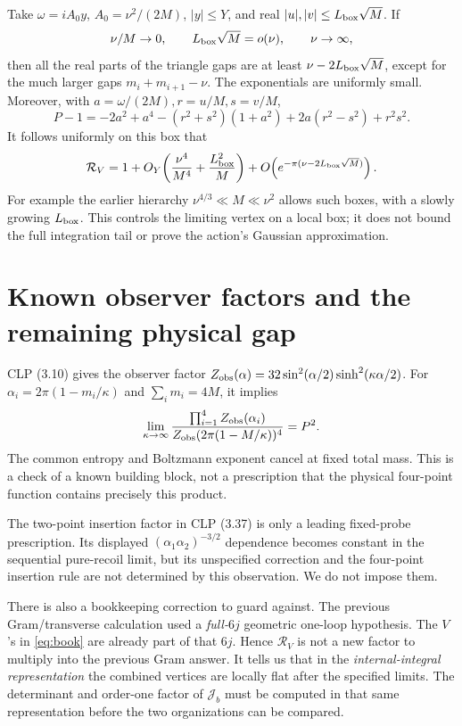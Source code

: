 \documentclass[11pt,a4paper]{article}
\begin{document}
Take \(\omega=iA_0y\), \(A_0=\nu^2/(2M)\), \(|y|\le Y\), and
real \(|u|,|v|\le L_{\rm box}\sqrt M\). If
\[
 \nu/M\to0,\qquad L_{\rm box}\sqrt M=o(\nu),\qquad \nu\to\infty,
\]
then all the real parts of the triangle gaps are at least
\(\nu-2L_{\rm box}\sqrt M\), except for the much larger gaps
\(m_i+m_{i+1}-\nu\). The exponentials are uniformly small.
Moreover, with \(a=\omega/(2M),r=u/M,s=v/M\),
\[
 P-1=-2a^2+a^4-(r^2+s^2)(1+a^2)+2a(r^2-s^2)+r^2s^2 .
\]
It follows uniformly on this box that
\begin{equation}
 \mathcal R_V=1+
 O_Y\!\left(\frac{\nu^4}{M^4}+\frac{L_{\rm box}^2}{M}\right)
 +O\!\left(e^{-\pi(\nu-2L_{\rm box}\sqrt M)}\right). \label{eq:flat}
\end{equation}
For example the earlier hierarchy \(\nu^{4/3}\ll M\ll\nu^2\)
allows such boxes, with a slowly growing \(L_{\rm box}\).
This controls the limiting vertex on a local box; it does not bound
the full integration tail or prove the action's Gaussian approximation.

\section{Known observer factors and the remaining physical gap}
CLP (3.10) gives the observer factor
\(Z_{\rm obs}(\alpha)=32\sin^2(\alpha/2)\sinh^2(\kappa\alpha/2)\).
For \(\alpha_i=2\pi(1-m_i/\kappa)\) and \(\sum_i m_i=4M\), it implies
\begin{equation}
 \lim_{\kappa\to\infty}
 \frac{\prod_{i=1}^4Z_{\rm obs}(\alpha_i)}
      {Z_{\rm obs}(2\pi(1-M/\kappa))^4}=P^2. \label{eq:obs}
\end{equation}
The common entropy and Boltzmann exponent cancel at fixed total mass.
This is a check of a known building block, not a prescription that
the physical four-point function contains precisely this product.

The two-point insertion factor in CLP (3.37) is only a leading
fixed-probe prescription. Its displayed \((\alpha_1\alpha_2)^{-3/2}\)
dependence becomes constant in the sequential pure-recoil limit,
but its unspecified correction and the four-point insertion rule
are not determined by this observation. We do not impose them.

There is also a bookkeeping correction to guard against. The
previous Gram/transverse calculation used a \emph{full-\(6j\)}
geometric one-loop hypothesis. The \(V\)'s in \eqref{eq:book} are
already part of that \(6j\). Hence \(\mathcal R_V\) is not a new factor
to multiply into the previous Gram answer. It tells us that in the
\emph{internal-integral representation} the combined vertices are
locally flat after the specified limits. The determinant and order-one
factor of \(\mathcal J_b\) must be computed in that same representation
before the two organizations can be compared.
\end{document}
